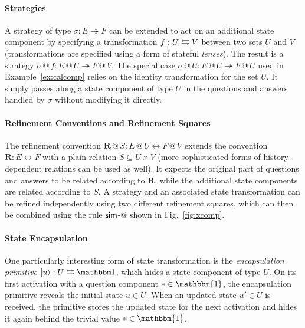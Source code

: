 \vspace*{-2ex}
\paragraph{Strategies}

A strategy of type $\sigma : E \twoheadrightarrow F$
can be extended to act on an additional state component
by specifying a transformation $f : U \leftrightarrows V$
between two sets $U$ and $V$
(transformations are specified using a form of stateful \emph{lenses}).
The result is a strategy
$\sigma \mathbin@ f : E \mathbin@ U \twoheadrightarrow F \mathbin@ V$.
The special case
$\sigma \mathbin@ U : E \mathbin@ U \twoheadrightarrow F \mathbin@ U$
used in Example~\ref{ex:calcomp}
relies on the identity transformation for the set $U$.
It simply passes along a state component of type $U$
in the questions and answers handled by $\sigma$
without modifying it directly.

\vspace*{-2ex}
\paragraph{Refinement Conventions and Refinement Squares}

The refinement convention
$\mathbf{R} \mathbin@ S : E \mathbin@ U \leftrightarrow F \mathbin@ V$
extends the convention $\mathbf{R} : E \leftrightarrow F$
with a plain relation $S \subseteq U \times V$
(more sophisticated forms of history-dependent relations can be used as well).
It expects the original part of questions and answers
to be related according to $\mathbf{R}$,
while the additional state components are related according to $S$.
A strategy and an associated state transformation 
can be refined independently
using two different refinement squares,
which can then be combined using the rule $ \mathsf{sim} $-$@$
shown in Fig.~\ref{fig:xcomp}.

\vspace*{-2ex}
\paragraph{State Encapsulation}

One particularly interesting form of state transformation
is the \emph{encapsulation primitive}
$[u\rangle : U \lensarrow \mathbbm1$,
which hides a state component of type $U$.
On its first activation with a question component ${*} \in \mathbbm{1}$,
the encapsulation primitive reveals the initial state $u \in U$.
When an updated state $u' \in U$ is received,
the primitive stores the updated state for the next activation
and hides it again behind the trivial value ${*} \in \mathbbm{1}$.


